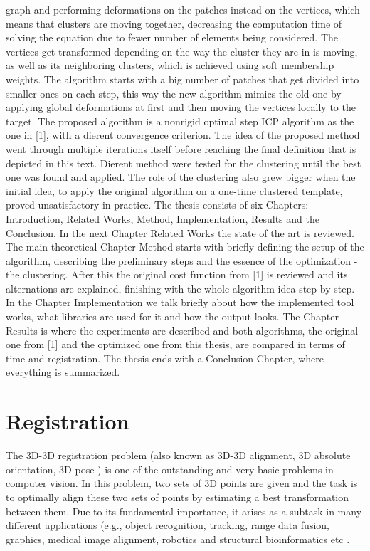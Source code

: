 \documentclass[../structure.tex]{subfiles}
\begin{document}
graph and performing deformations on the patches instead on the vertices,
which means that clusters are moving together, decreasing the computation
time of solving the equation due to fewer number of elements being
considered. The vertices get transformed depending on the way the cluster
they are in is moving, as well as its neighboring clusters, which is achieved
using soft membership weights. The algorithm starts with a big number of
patches that get divided into smaller ones on each step, this way the new
algorithm mimics the old one by applying global deformations at first and
then moving the vertices locally to the target. The proposed algorithm is
a nonrigid optimal step ICP algorithm as the one in [1], with a dierent
convergence criterion.
The idea of the proposed method went through multiple iterations itself
before reaching the final definition that is depicted in this text. Dierent
method were tested for the clustering until the best one was found and applied.
The role of the clustering also grew bigger when the initial idea, to
apply the original algorithm on a one-time clustered template, proved unsatisfactory
in practice.
The thesis consists of six Chapters: Introduction, Related Works, Method,
Implementation, Results and the Conclusion. In the next Chapter Related
Works the state of the art is reviewed. The main theoretical Chapter Method
starts with briefly defining the setup of the algorithm, describing the preliminary
steps and the essence of the optimization - the clustering. After this the
original cost function from [1] is reviewed and its alternations are explained,
finishing with the whole algorithm idea step by step. In the Chapter Implementation
we talk briefly about how the implemented tool works, what
libraries are used for it and how the output looks. The Chapter Results is
where the experiments are described and both algorithms, the original one
from [1] and the optimized one from this thesis, are compared in terms of
time and registration. The thesis ends with a Conclusion Chapter, where
everything is summarized.
	\section{Registration}
	The 3D-3D registration problem (also known as 3D-3D alignment, 3D absolute orientation, 3D pose ) is one of the outstanding and very basic problems in computer vision. In this problem, two sets of 3D points are given and the task is to optimally align these two sets of points by estimating a best transformation between them. Due to its fundamental importance, it arises as a subtask in many different applications (e.g., object recognition, tracking, range data fusion, graphics, medical image alignment, robotics and structural bioinformatics etc \cite{Li2007}.
\end{document}
